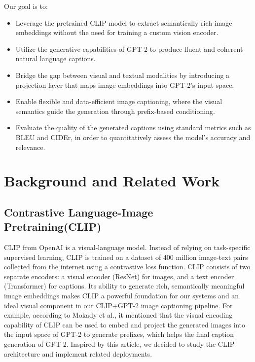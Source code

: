 \documentclass[11pt]{article}
\begin{document}
Our goal is to:
\begin{itemize}
    \item Leverage the pretrained CLIP model to extract semantically rich image embeddings without the need for training a custom vision encoder.
    \item Utilize the generative capabilities of GPT-2 to produce fluent and coherent natural language captions.
    \item Bridge the gap between visual and textual modalities by introducing a projection layer that maps image embeddings into GPT-2's input space.
    \item Enable flexible and data-efficient image captioning, where the visual semantics guide the generation through prefix-based conditioning.
    \item Evaluate the quality of the generated captions using standard metrics such as BLEU and CIDEr, in order to quantitatively assess the model's accuracy and relevance.
\end{itemize}

\section{Background and Related Work}

    \subsection{Contrastive Language-Image Pretraining(CLIP)}
    CLIP from OpenAI is a visual-language model. Instead of relying on 
    task-specific supervised learning, CLIP is trained on a dataset of 400
    million image-text pairs collected from the internet using a contrastive 
    loss function. CLIP consists of two separate encoders: a visual encoder 
    (ResNet) for images, and a text encoder (Transformer) for captions. 
    Its ability to generate rich, semantically meaningful image 
    embeddings makes CLIP a powerful foundation for our systems and 
    an ideal visual component in our CLIP+GPT-2 image captioning pipeline. 
    For example, according to Mokady et al.\cite{Mokady2021}, it mentioned that the visual encoding capability of 
    CLIP can be used to embed and project the generated images into the input 
    space of GPT-2 to generate prefixes, which helps the final caption generation of GPT-2. Inspired by this article, we decided to study the CLIP architecture and implement related deployments.
\end{document}
